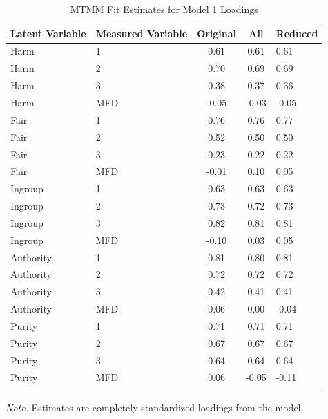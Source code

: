 \documentclass[
  man,floatsintext]{apa6}
\begin{document}
\begin{table}[h]

\begin{center}
\begin{threeparttable}

\caption{\label{tab:mtmm-model1-table2}MTMM Fit Estimates for Model 1 Loadings}

\footnotesize{

\begin{tabular}{llccl}
\toprule
Latent Variable & Measured Variable & Original & All & Reduced\\
\midrule
Harm & 1 & 0.61 & 0.61 & 0.61\\
Harm & 2 & 0.70 & 0.69 & 0.69\\
Harm & 3 & 0.38 & 0.37 & 0.36\\
Harm & MFD & -0.05 & -0.03 & -0.05\\
Fair & 1 & 0.76 & 0.76 & 0.77\\
Fair & 2 & 0.52 & 0.50 & 0.50\\
Fair & 3 & 0.23 & 0.22 & 0.22\\
Fair & MFD & -0.01 & 0.10 & 0.05\\
Ingroup & 1 & 0.63 & 0.63 & 0.63\\
Ingroup & 2 & 0.73 & 0.72 & 0.73\\
Ingroup & 3 & 0.82 & 0.81 & 0.81\\
Ingroup & MFD & -0.10 & 0.03 & 0.05\\
Authority & 1 & 0.81 & 0.80 & 0.81\\
Authority & 2 & 0.72 & 0.72 & 0.72\\
Authority & 3 & 0.42 & 0.41 & 0.41\\
Authority & MFD & 0.06 & 0.00 & -0.04\\
Purity & 1 & 0.71 & 0.71 & 0.71\\
Purity & 2 & 0.67 & 0.67 & 0.67\\
Purity & 3 & 0.64 & 0.64 & 0.64\\
Purity & MFD & 0.06 & -0.05 & -0.11\\
\bottomrule
\addlinespace
\end{tabular}

}

\begin{tablenotes}[para]
\normalsize{\textit{Note.} Estimates are completely standardized loadings from the model.}
\end{tablenotes}

\end{threeparttable}
\end{center}

\end{table}
\end{document}
